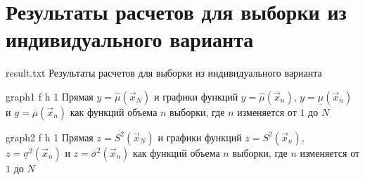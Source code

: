 \chapter{Результаты расчетов для выборки из индивидуального варианта}

{result.txt} %
{Результаты расчетов для выборки из индивидуального варианта} %

\clearpage

{graph1} %
{f} %
{h} %
{1\textwidth} %
{Прямая $y=\hat \mu (\vec x_N)$ и графики функций $y=\hat \mu (\vec x_n)$, $y=\underline \mu (\vec x_n)$ и $y=\overline \mu (\vec x_n)$ как функций объема $n$ выборки, где $n$ изменяется от $1$ до $N$} %

\clearpage

{graph2} %
{f} %
{h} %
{1\textwidth} %
{Прямая \mbox{$z=S^2 (\vec x_N)$} и графики функций $z=S^2 (\vec x_n)$, $z=\underline \sigma^2 (\vec x_n)$ и \mbox{$z=\overline \sigma^2 (\vec x_n)$} как функций объема $n$ выборки, где $n$ изменяется от $1$ до $N$} %